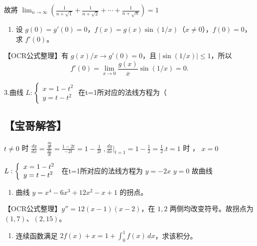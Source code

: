 \documentclass[11pt,fontset=fandol]{ctexart}
\providecommand{\tightlist}{\setlength{\itemsep}{0pt}\setlength{\parskip}{0pt}}
\begin{document}
故將
\(\lim _ { n \to \infty } ( { \frac { 1 } { n + { \sqrt { 1 } } } } + { \frac { 1 } { n + { \sqrt { 2 } } } } + \cdots + { \frac { 1 } { n + { \sqrt { n } } } } ) = 1\)

\begin{enumerate}
\def\labelenumi{\arabic{enumi}.}
\setcounter{enumi}{1}
\tightlist
\item
  设
  \(g(0)=g'(0)=0\)，\(f(x)=g(x)\sin(1/x)\)（\(x\ne0\)），\(f(0)=0\)，求
  \(f'(0)\)。
\end{enumerate}

【OCR公式整理】有 \(g(x)/x\to g'(0)=0\)，且 \(|\sin(1/x)|\le1\)，所以 \[
f'(0)=\lim_{x\to0}\frac{g(x)}x\sin(1/x)=0.
\]

3.曲线
\(L : \left\{ { \begin{array} { l } { x = 1 - t ^ { 2 } } \\ { y = t - t ^ { 2 } } \end{array} } \right.\)
在t=1所对应的法线方程为（

\subsection{【宝哥解答】}\label{ux5b9dux54e5ux89e3ux7b54}

\(t \neq 0\) 时
\(\frac { d y } { d x } = \frac { \displaystyle \frac { d y } { d t } } { \displaystyle \frac { d x } { d t } } = \frac { 1 - 2 t } { - 2 t } = 1 - \frac { 1 } { 2 t } \ , \frac { d y } { d x } \big | _ { t = 1 } = 1 - \frac { 1 } { 2 } = \frac { 1 } { 2 } . t = 1\)
时 ， \(x = 0\)

\(L : \left\{ \begin{array} { l l } { x = 1 - t ^ { 2 } } \\ { y = t - t ^ { 2 } } \end{array} \right.\)
在t=1所对应的法线方程为 \(y = - 2 x\) \(y = 0\) 故曲线

\begin{enumerate}
\def\labelenumi{\arabic{enumi}.}
\setcounter{enumi}{3}
\tightlist
\item
  曲线 \(y=x^4-6x^3+12x^2-x+1\) 的拐点。
\end{enumerate}

【OCR公式整理】\(y''=12(x-1)(x-2)\)，在 \(1,2\) 两侧均改变符号。故拐点为
\((1,7)\)、\((2,15)\)。

\begin{enumerate}
\def\labelenumi{\arabic{enumi}.}
\setcounter{enumi}{4}
\tightlist
\item
  连续函数满足 \(2f(x)+x=1+\int_0^1f(x)\,dx\)，求该积分。
\end{enumerate}
\end{document}
